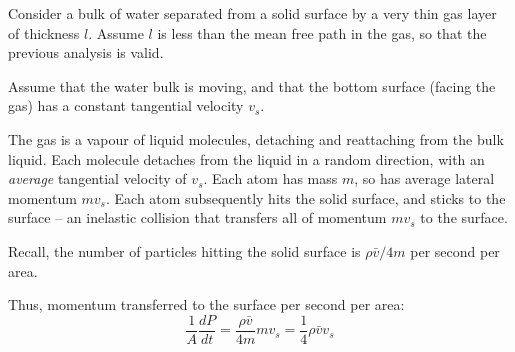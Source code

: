 \documentclass[a4paper]{report}
\begin{document}
Consider a bulk of water separated from a solid surface by a very thin gas layer of thickness $l$.  Assume $l$ is less than the mean free path in the gas, so that the previous analysis is valid.

Assume that the water bulk is moving, and that the bottom surface (facing the gas) has a constant tangential velocity $v_{s}$.

The gas is a vapour of liquid molecules, detaching and reattaching from the bulk liquid.  Each molecule detaches from the liquid in a random direction, with an \emph{average} tangential velocity of $v_{s}$.  Each atom has mass $m$, so has average lateral momentum $mv_{s}$. Each atom subsequently hits the solid surface, and sticks to the surface  -- an inelastic collision that transfers all of momentum $mv_{s}$ to the surface. 

\vspace{1em}
\begin{center}
\end{center}

\vspace{1em}
Recall, the number of particles hitting the solid surface is $ \rho \bar{v} / 4 m$ per second per area.

Thus, momentum transferred to the surface per second per area:
\begin{equation}
\frac{1}{A} \frac{dP}{dt} = \frac{\rho \bar{v}}{4 m} m v_{s} 
= \frac{1}{4} \rho \bar{v} v_{s}
\end{equation}
\end{document}
